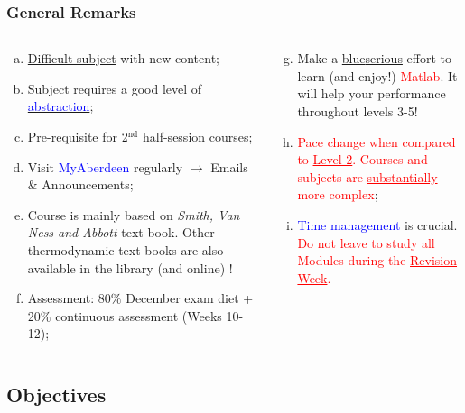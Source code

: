 \documentclass[10pt,compress]{beamer}
\newcommand{\red}{\textcolor{red}}
\newcommand{\blue}{\textcolor{blue}}
\begin{document}
\begin{frame}
 \frametitle{General Remarks}
  \begin{columns}
     \begin{column}[l]{0.5\linewidth}
        \begin{enumerate}[(a)]%
           \item<1-> \underline{Difficult subject} with new content;
           \item<1-> Subject requires a good level of \underline{\blue{abstraction}};
           \item<2-> Pre-requisite for 2$^{\text{nd}}$ half-session courses;
           \item<2-> Visit \blue{MyAberdeen} regularly $\rightarrow$ Emails $\&$ Announcements;
           \item<3-> Course is mainly based on {\it Smith, Van Ness and Abbott} text-book. Other thermodynamic text-books are also available in the library (and online) !
           \item<4-> Assessment: 80$\%$ December exam diet + 20$\%$ continuous assessment (Weeks 10-12); 
        \end{enumerate}
     \end{column}
     \begin{column}[l]{0.5\linewidth}
        \begin{enumerate}[(a)]\setcounter{enumi}{6}%
           \item<4-> Make a \underline{blue{serious}} effort to learn (and enjoy!) \red{Matlab}. It will help your performance throughout levels 3-5!
           \item<5-> \red{Pace change when compared to \underline{Level 2}. Courses and subjects are \underline{substantially} more complex};
           \item<6-> \blue{Time management} is crucial. \red{Do not leave to study all Modules during the \underline{Revision Week}.}   
        \end{enumerate}
     \end{column}
  \end{columns}
\end{frame}




\subsection{Objectives}
\end{document}
